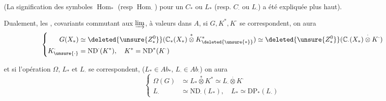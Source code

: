 (La signification des symboles $\operatorname{Hom}_{\ast}$ (resp $\operatorname{Hom}_{\cdot}$)
pour  un $C_{\ast}$ ou $L_{\ast}$  (resp. $C_{\cdot}$ ou $L_{\cdot}$)
a été expliquée plus haut).

Dualement,  les   , covariants
commutant aux $\varinjlim$, à valeurs dans
$A$, si $G,K^{\ast},K^{\cdot}$ se correspondent,
on aura
\[
\left\{\begin{aligned}
G(X_{\ast})&\simeq\deleted{\unsure{Z^{0}_{\ast}}}(\mathbb C_{\ast}(X_{\ast})\overset{\ast}{\otimes}K_{\deleted{\unsure{\ast}}}^{\ast})
\simeq\deleted{\unsure{Z^{0}_{\ast}}}(\mathbb C_{\cdot}(X_{\ast})\overset{\cdot}{\otimes}K^{\cdot})\\
K_{\unsure{\cdot}}^{\cdot}&=\mathrm{ND}^{\cdot}(K^{\ast}),\quad K^{\ast}=\mathrm{ND}^{\ast}(K^{\cdot})
\end{aligned}\right.
\]

et si l'opération $\Omega$, $L_{\ast}$ et $L_{\cdot}$ se
correspondent, ($L_{\ast}\in\mathit{Ab}_{\ast}$, $L_{\cdot}\in\mathit{Ab}_{\cdot}$)
on aura
\[
\left\{\begin{aligned}
\Omega(G)&\simeq L_{\ast}\overset{\ast}{\otimes}K^{\ast}
\simeq L_{\cdot}\overset{\cdot}{\otimes}K^{\cdot}\\
L_{\cdot}&\simeq\mathrm{ND}_{\cdot}(L_{\ast}),\quad L_{\ast}\simeq\mathrm{DP}_{\ast}(L_{\cdot})
\end{aligned}\right.
\]
